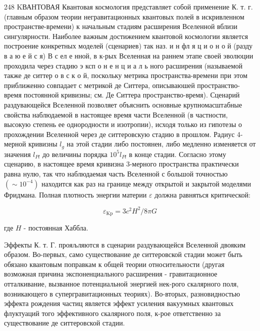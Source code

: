 \documentclass[10pt]{article}
\begin{document}
248 KВАНТОВАЯ Квантовая космология представляет собой применение К. т. г. (главным образом теории негравитационных квантовых полей в искривленном пространстве-времени) к начальным стадиям расширения Вселенной вблизи сингулярности. Наиболее важным достижением квантовой космологии является построение конкретных моделей (сценариев) так наз. и н фл я ц и о н о й (разду в а ю е й с я) В с ел е нной, в к-рых Вселенная на раннем этапе своей эволюции проходила через стадию э ксп о н е н ц и а л ь ного расширения (называемой также де ситтер о в с к о й, поскольку метрика пространства-времени при этом приближенно совпадает с метрикой де Ситтера, описываюшей пространство-время постоянной кривизны; см. Де Ситтера пространство-время). Сценарий раздувающейся Вселенной позволяет объяснить основные крупномасштабные свойства наблюдаемой в настоящее время части Вселенной (в частности, высокую степень ее однородности и изотропии), исходя только из гипотезы о прохождении Вселенной через де ситтеровскую стадию в прошлом. Радиус 4-мерной кривизны $l_{g}$ на этой стадии либо постоянен, либо медленно изменяется от значения $l_{P l}$ до величины порядка $10^{5} l_{P l}$ в конце стадии. Согласно этому сценарию, в настоящее время кривизна 3-мерного пространства практически равна нулю, так что наблюдаемая часть Вселенной с большой точностью $\left(\sim 10^{-4}\right)$ находится как раз на границе между открытой и закрытой моделями Фридмана. Полная плотность энергии материи $\varepsilon$ должна равняться критической:



\[

\varepsilon_{\mathrm{Kp}}=3 c^{2} H^{2} / 8 \pi G

\]



где $H$ - постоянная Хаббла.



Эффекты К. т. Г. прояљляются в сценарии раздувающейся Вселенной двояким образом. Во-первых, само существование де ситтеровской стадии может быть обязано квантовым поправкам к общей теории относительности (другая возможная причина экспоненциального расширения - гравитационное отталкивание, вызванное потенциальной энергией нек-рого скалярного поля, возникающего в супергравитационных теориях). Во-вторых, разновидностью эффекта рождения частиц является эффект усиления вакуумных квантовых флуктуаций того эффективного скалярного поля, к-рое ответственно за существование де ситтеровской стадии.
\end{document}
